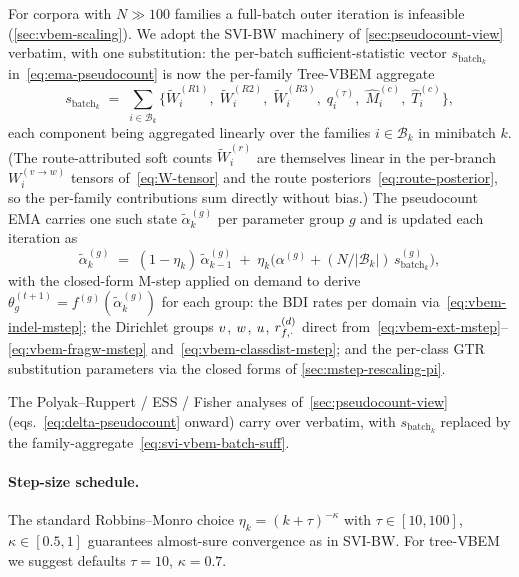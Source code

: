 For corpora with $N \gg 100$ families a full-batch outer iteration
is infeasible (\cref{sec:vbem-scaling}). We adopt the SVI-BW
machinery of \cref{sec:pseudocount-view} verbatim, with one
substitution: the per-batch sufficient-statistic vector
$s_{\text{batch}_k}$ in~\eqref{eq:ema-pseudocount} is now the
per-family Tree-VBEM aggregate
\begin{equation}
\label{eq:svi-vbem-batch-suff}
s_{\text{batch}_k} \;=\;
\sum_{i \in \mathcal{B}_k}
\Big\{
   \tilde{W}^{(R1)}_i,\;
   \tilde{W}^{(R2)}_i,\;
   \tilde{W}^{(R3)}_i,\;
   q^{(\tau)}_i,\;
   \hat M^{(c)}_i,\;
   \hat T^{(c)}_i
\Big\},
\end{equation}
each component being aggregated linearly over the families
$i \in \mathcal{B}_k$ in minibatch $k$. (The route-attributed soft
counts $\tilde{W}^{(r)}_i$ are themselves linear in the per-branch
$W_i^{(v\to w)}$ tensors of~\eqref{eq:W-tensor} and the route
posteriors~\eqref{eq:route-posterior}, so the per-family contributions
sum directly without bias.) The pseudocount EMA carries one such state
$\tilde{\alpha}^{(g)}_k$ per parameter group $g$ and is updated each
iteration as
\begin{equation}\label{eq:svi-vbem-update}
   \tilde{\alpha}^{(g)}_k
   \;=\; (1 - \eta_k)\,\tilde{\alpha}^{(g)}_{k-1}
   \;+\; \eta_k\bigl(\alpha^{(g)} + (N/|\mathcal{B}_k|)\, s^{(g)}_{\text{batch}_k}\bigr),
\end{equation}
with the closed-form M-step applied on demand to derive
$\theta^{(t+1)}_g = f^{(g)}(\tilde{\alpha}^{(g)}_k)$ for each group:
the BDI rates per domain via~\eqref{eq:vbem-indel-mstep}; the
Dirichlet groups $v$, $w$, $u$, $r^{(d)}_{f, \cdot}$
direct from~\eqref{eq:vbem-ext-mstep}--\eqref{eq:vbem-fragw-mstep}
and~\eqref{eq:vbem-classdist-mstep}; and the per-class GTR substitution
parameters via the closed forms of \cref{sec:mstep-rescaling-pi}.

The Polyak--Ruppert / ESS / Fisher analyses
of~\cref{sec:pseudocount-view} (eqs.~\eqref{eq:delta-pseudocount}
onward) carry over verbatim, with $s_{\text{batch}_k}$ replaced by
the family-aggregate~\eqref{eq:svi-vbem-batch-suff}.

\paragraph{Step-size schedule.}
The standard Robbins--Monro choice
$\eta_k = (k + \tau)^{-\kappa}$ with $\tau \in [10, 100]$,
$\kappa \in [0.5, 1]$ guarantees almost-sure convergence as in
SVI-BW. For tree-VBEM we suggest defaults
$\tau = 10$, $\kappa = 0.7$.

